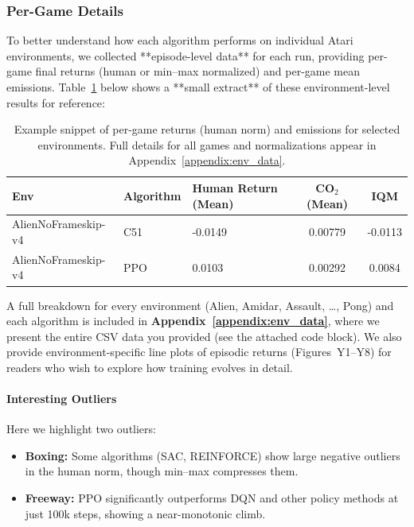 \subsubsection{Per-Game Details}
To better understand how each algorithm performs on individual Atari environments, 
we collected **episode-level data** for each run, providing per-game final returns 
(human or min--max normalized) and per-game mean emissions. Table~\ref{tab:per_game_example}
below shows a **small extract** of these environment-level results for reference:
\begin{table} 
	\centering
	\caption{Example snippet of per-game returns (human norm) and emissions for selected environments. 
		Full details for all games and normalizations appear in Appendix~\ref{appendix:env_data}.}
	\label{tab:per_game_example}
	\begin{tabular}{lllcc}
		\toprule
		\textbf{Env} & \textbf{Algorithm} & \textbf{Human Return (Mean)} & \textbf{CO$_2$ (Mean)} & \textbf{IQM} \\
		\midrule
		AlienNoFrameskip-v4 & C51 & -0.0149 & 0.00779 & -0.0113 \\
		AlienNoFrameskip-v4 & PPO & 0.0103 & 0.00292 & 0.0084 \\
		\bottomrule
	\end{tabular}
\end{table}

\noindent
A full breakdown for every environment (Alien, Amidar, Assault, \ldots, Pong) 
and each algorithm is included in \textbf{Appendix~\ref{appendix:env_data}}, 
where we present the entire CSV data you provided (see the attached code block).
We also provide environment-specific line plots of episodic returns (Figures~Y1–Y8)
for readers who wish to explore how training evolves in detail.

\paragraph{Interesting Outliers}
Here we highlight two outliers:
\begin{itemize}
	\item \textbf{Boxing:} Some algorithms (SAC, REINFORCE) show large negative outliers 
	in the human norm, though min–max compresses them. 
	\item \textbf{Freeway:} PPO significantly outperforms DQN and other policy methods 
	at just 100k steps, showing a near-monotonic climb.
\end{itemize}

